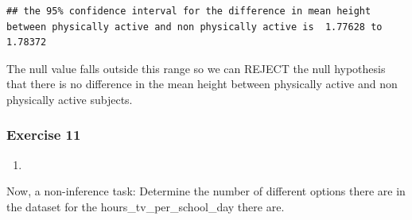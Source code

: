 \documentclass[
]{article}
\newenvironment{Shaded}{\begin{snugshade}}{\end{snugshade}}
\newcommand{\CommentTok}[1]{\textcolor[rgb]{0.56,0.35,0.01}{\textit{#1}}}
\newcommand{\DecValTok}[1]{\textcolor[rgb]{0.00,0.00,0.81}{#1}}
\newcommand{\KeywordTok}[1]{\textcolor[rgb]{0.13,0.29,0.53}{\textbf{#1}}}
\newcommand{\NormalTok}[1]{#1}
\newcommand{\OperatorTok}[1]{\textcolor[rgb]{0.81,0.36,0.00}{\textbf{#1}}}
\newcommand{\StringTok}[1]{\textcolor[rgb]{0.31,0.60,0.02}{#1}}
\begin{document}
\begin{Shaded}
\end{Shaded}

\begin{verbatim}
## the 95% confidence interval for the difference in mean height between physically active and non physically active is  1.77628 to 1.78372
\end{verbatim}

The null value falls outside this range so we can REJECT the null
hypothesis that there is no difference in the mean height between
physically active and non physically active subjects.

\hypertarget{exercise-11}{%
\subsubsection{Exercise 11}\label{exercise-11}}

\begin{enumerate}
\def\labelenumi{\arabic{enumi}.}
\item
\end{enumerate}

Now, a non-inference task: Determine the number of different options
there are in the dataset for the hours\_tv\_per\_school\_day there are.

\begin{Shaded}
\end{Shaded}
\end{document}
